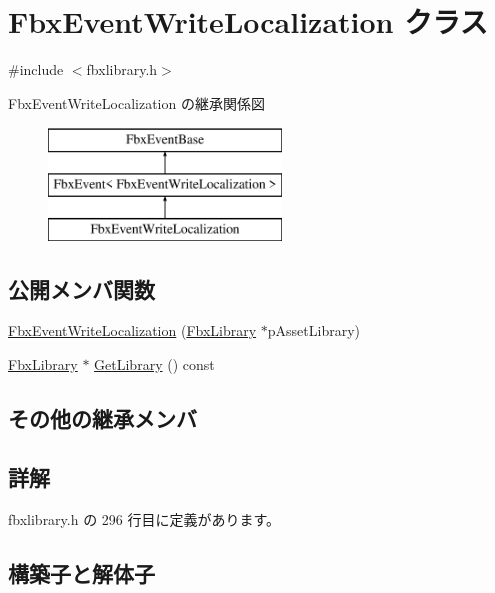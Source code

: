 \hypertarget{class_fbx_event_write_localization}{}\section{Fbx\+Event\+Write\+Localization クラス}
\label{class_fbx_event_write_localization}


{\ttfamily \#include $<$fbxlibrary.\+h$>$}

Fbx\+Event\+Write\+Localization の継承関係図\begin{figure}[H]
\begin{center}
\leavevmode
\includegraphics[height=3.000000cm]{class_fbx_event_write_localization}
\end{center}
\end{figure}
\subsection*{公開メンバ関数}
\begin{DoxyCompactItemize}
\item 
\hyperlink{class_fbx_event_write_localization_a45873b27b60b583b9e2d658fd6ba0916}{Fbx\+Event\+Write\+Localization} (\hyperlink{class_fbx_library}{Fbx\+Library} $\ast$p\+Asset\+Library)
\item 
\hyperlink{class_fbx_library}{Fbx\+Library} $\ast$ \hyperlink{class_fbx_event_write_localization_a10110bc0d52be7ba742c5c83c917c40c}{Get\+Library} () const
\end{DoxyCompactItemize}
\subsection*{その他の継承メンバ}


\subsection{詳解}


 fbxlibrary.\+h の 296 行目に定義があります。



\subsection{構築子と解体子}
\mbox{\label{class_fbx_event_write_localization_a45873b27b60b583b9e2d658fd6ba0916}} 
